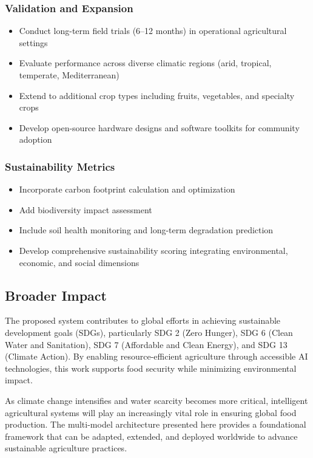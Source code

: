 \documentclass[conference]{IEEEtran}
\begin{document}
\subsubsection{Validation and Expansion}
\begin{itemize}
\item Conduct long-term field trials (6--12 months) in operational agricultural settings
\item Evaluate performance across diverse climatic regions (arid, tropical, temperate, Mediterranean)
\item Extend to additional crop types including fruits, vegetables, and specialty crops
\item Develop open-source hardware designs and software toolkits for community adoption
\end{itemize}

\subsubsection{Sustainability Metrics}
\begin{itemize}
\item Incorporate carbon footprint calculation and optimization
\item Add biodiversity impact assessment
\item Include soil health monitoring and long-term degradation prediction
\item Develop comprehensive sustainability scoring integrating environmental, economic, and social dimensions
\end{itemize}

\subsection{Broader Impact}

The proposed system contributes to global efforts in achieving sustainable development goals (SDGs), particularly SDG 2 (Zero Hunger), SDG 6 (Clean Water and Sanitation), SDG 7 (Affordable and Clean Energy), and SDG 13 (Climate Action). By enabling resource-efficient agriculture through accessible AI technologies, this work supports food security while minimizing environmental impact.

As climate change intensifies and water scarcity becomes more critical, intelligent agricultural systems will play an increasingly vital role in ensuring global food production. The multi-model architecture presented here provides a foundational framework that can be adapted, extended, and deployed worldwide to advance sustainable agriculture practices.
\end{document}
